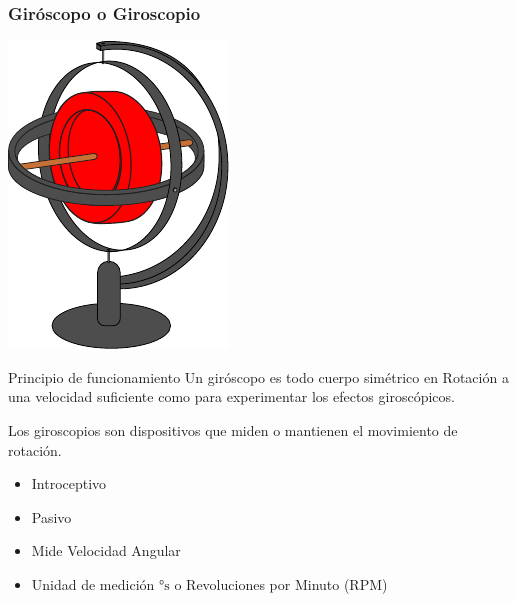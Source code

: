 \begin{frame}
    \frametitle{Giróscopo o Giroscopio}
    \footnotesize
    \begin{center}
        \includegraphics[width=0.2\columnwidth]{images/gyroscope.pdf}
    \end{center}

    \begin{block}{Principio de funcionamiento}
        Un giróscopo es todo cuerpo simétrico en Rotación a una velocidad suficiente como para experimentar los efectos giroscópicos.

        Los giroscopios son dispositivos que miden o mantienen el movimiento de rotación.
    \end{block}

    \begin{itemize}
        \item Introceptivo
        \item Pasivo
        \item Mide Velocidad Angular
        \item Unidad de medición $\si{\degree\second}$ o Revoluciones por Minuto (RPM)
    \end{itemize}


\end{frame}

